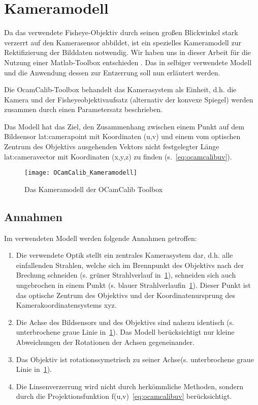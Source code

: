 \section{Kameramodell} \label{sec:kameramodell}
Da das verwendete Fisheye-Objektiv durch seinen großen Blickwinkel stark verzerrt auf den Kamerasensor abbildet, ist ein spezielles Kameramodell zur Rektifizierung der Bilddaten notwendig. Wir haben uns in dieser Arbeit für die Nutzung einer Matlab-Toolbox entschieden  \autocite{OCamCalibOmnidirectionalCamera, scaramuzzaFlexibleTechniqueAccurate2006, scaramuzzaToolboxEasilyCalibrating2006, scaramuzzaOmnidirectionalVisionCalibration2007, rufliAutomaticDetectionCheckerboards2008}. Das in selbiger verwendete Modell und die Anwendung dessen zur Entzerrung soll nun erläutert werden. 

Die OcamCalib-Toolbox behandelt das Kamerasystem als Einheit, d.h. die Kamera und der Fisheyeobjektivaufsatz (alternativ der konvexe Spiegel) werden zusammen durch einen Parametersatz beschrieben.

Das Modell hat das Ziel, den Zusammenhang zwischen einem Punkt auf dem Bildsensor \gls{lat:camerapoint} mit Koordinaten (u,v) und einem vom optischen Zentrum des Objektivs ausgehenden Vektors nicht festgelegter Länge \gls{lat:cameravector} mit Koordinaten (x,y,z) zu finden (s.~\eqref{eq:ocamcalibuv}).

\begin{figure}[H]
  \centering
  \texttt{[image: OCamCalib\_Kameramodell]}
  \caption{Das Kameramodell der OCamCalib Toolbox}
  \label{fig:kameramodell}
\end{figure}

\subsection{Annahmen}
Im verwendeten Modell werden folgende Annahmen getroffen:
\begin{enumerate}
\item Die verwendete Optik stellt ein zentrales Kamerasystem dar, d.h. alle einfallenden Strahlen, welche sich im Brennpunkt des Objektivs nach der Brechung schneiden (s. grüner Strahlverlauf in~\ref{fig:kameramodell}), schneiden sich auch ungebrochen in einem Punkt (s. blauer Strahlverlaufin~\ref{fig:kameramodell}). Dieser Punkt ist das optische Zentrum des Objektivs und der Koordinatenursprung des Kamerakoordinatensystems xyz.
\item \label{item:ocamcalibassm2} Die Achse des Bildsensors und des Objektivs sind nahezu identisch (s. unterbrochene graue Linie in~\ref{fig:kameramodell}). Das Modell berücksichtigt nur kleine Abweichungen der Rotationen der Achsen gegeneinander.
\item Das Objektiv ist rotationssymetrisch zu seiner Achse(s. unterbrochene graue Linie in~\ref{fig:kameramodell}).
\item Die Linsenverzerrung wird nicht durch herkömmliche Methoden, sondern durch die Projektionsfunktion f(u,v)~\eqref{eq:ocamcalibuv} berücksichtigt.
\end{enumerate}

